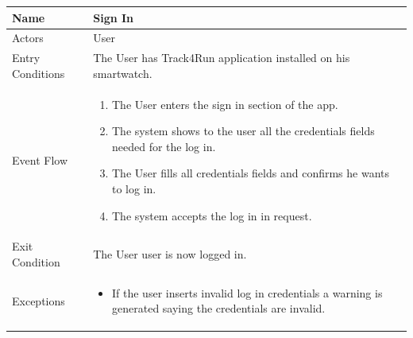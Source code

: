 \begin{enumerate}
\FloatBarrier
\begin{table}[h]
\begin{tabular}{|l|p{}|}
\hline
Name             & Sign In \\ \hline
Actors           & User  \\ \hline
Entry Conditions & The User has Track4Run application installed on his smartwatch.    \\ \hline
Event Flow       & \begin{enumerate}
			\item The User enters the sign in section of the app.
            \item The system shows to the user all the credentials fields needed for the log in.
            \item The User fills all credentials fields and confirms he wants to log in.
            \item The system accepts the log in in request.
        \end{enumerate}\\ \hline
Exit Condition   & The User user is now logged in.\\ \hline
Exceptions       & \begin{itemize}
\item If the user inserts invalid log in credentials a warning is generated saying the credentials are invalid.
\end{itemize}\\ \hline
\end{tabular}
\end{table}
\FloatBarrier


\end{enumerate}
